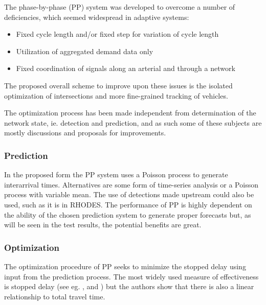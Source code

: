 The phase-by-phase (PP) system was developed to overcome a number of
deficiencies, which seemed widespread in adaptive systems:

\begin{itemize}
\item Fixed cycle length and/or fixed step for variation of cycle length
\item Utilization of aggregated demand data only
\item Fixed coordination of signals along an arterial and through a network
\end{itemize}

The proposed overall scheme to improve upon these issues is the
isolated optimization of intersections and more fine-grained tracking
of vehicles.

The optimization process has been made independent from determination
of the network state, ie. detection and prediction, and as such some of
these subjects are mostly discussions and proposals for improvements.

\subsubsection*{Prediction}

In the proposed form the PP system uses a Poisson process to generate
interarrival times.  Alternatives are some form of time-series
analysis or a Poisson process with variable mean. The use of
detections made upstream could also be used, such as it is in RHODES.
The performance of PP is highly dependent on the ability of the chosen
prediction system to generate proper forecasts but, as will be seen in
the test results, the potential benefits are great.

\subsubsection*{Optimization}

The optimization procedure of PP seeks to minimize the stopped delay
using input from the prediction process. The most widely used measure
of effectiveness is stopped delay (see eg. \cite{9}, \cite{38} and
\cite{31}) but the authors show that there is also a linear
relationship to total travel time.

